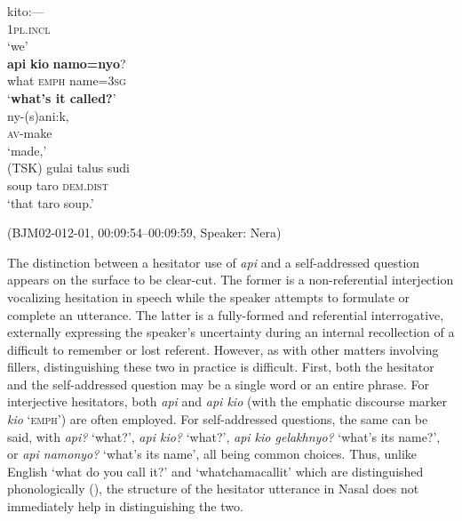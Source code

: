 \documentclass[output=paper,colorlinks,citecolor=brown
\ChapterDOI{10.5281/zenodo.15697585}
]{langscibook}
\begin{document}
\begin{exe}
    \ex\label{ex:api-kio-namonyo} \begin{xlist}[0\quad →A:]
         \gll
        kito:--- \\
        1\textsc{pl.incl} \\
        \glt `we' \\
         \gll
        \textbf{api} \textbf{kio} \textbf{namo=nyo}? \\
        what \textsc{emph} name=3\textsc{sg}\\
        \glt `\textbf{what's it called?}' \\
        \exi{3\quad \hphantom{→N:}} \gll
        ny-(s)ani:k, \\
        \textsc{av}-make \\
        \glt `made,' \\
        \exi{4\quad \hphantom{→N:}} \gll
        (TSK) gulai talus sudi \\
        {} soup taro \textsc{dem.dist} \\
        \glt `that taro soup.' \\
    \end{xlist}
    \hfill (BJM02-012-01, 00:09:54–00:09:59, Speaker: Nera) 
\end{exe}

The distinction between a hesitator use of \textit{api} and a self-addressed question appears on the surface to be clear-cut. The former is a non-referential interjection vocalizing hesitation in speech while the speaker attempts to formulate or complete an utterance. The latter is a fully-formed and referential interrogative, externally expressing the speaker's uncertainty during an internal recollection of a difficult to remember or lost referent. However, as with other matters involving fillers, distinguishing these two in practice is difficult. First, both the hesitator and the self-addressed question may be a single word or an entire phrase. For interjective hesitators, both \textit{api} and \textit{api kio} (with the emphatic discourse marker \textit{kio} `\textsc{emph}') are often employed. For self-addressed questions, the same can be said, with \textit{api?} `what?', \textit{api kio?} `what?', \textit{api kio gelakhnyo?} `what's its name?', or \textit{api namonyo?} `what's its name', all being common choices. Thus, unlike English `what do you call it?' and `whatchamacallit' which are distinguished phonologically (\cite{enfield2003definition}), the structure of the hesitator utterance in Nasal does not immediately help in distinguishing the two.
\end{document}
